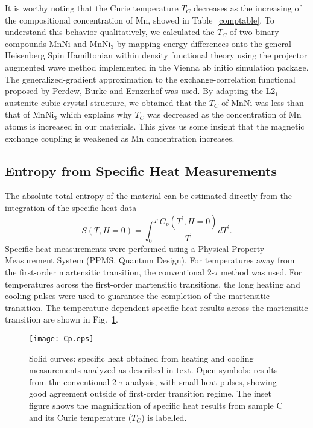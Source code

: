 \documentclass[sort&compress,twocolumn,3p]{elsarticle}
\begin{document}
It is worthy noting that the Curie temperature $T_C$ decreases as the increasing of the compositional concentration of Mn, showed in Table~\ref{comptable}.
To understand this behavior qualitatively, we calculated the $T_C$ of two binary compounds MnNi and MnNi$_3$ by mapping energy differences onto the general Heisenberg Spin Hamiltonian within density functional theory\cite{Hohenberg1964,Kohn1965} using the projector augmented wave method\cite{Kresse1999} implemented in the Vienna ab initio simulation package\cite{Kresse1993,Kresse1996}.
The generalized-gradient approximation to the exchange-correlation functional proposed by Perdew, Burke and Ernzerhof\cite{Perdew1996} was used.
By adapting the L2$_1$ austenite cubic crystal structure, we obtained that the $T_C$ of MnNi was less than that of MnNi$_3$ which explains why $T_C$ was decreased as the concentration of Mn atoms is increased in our materials.
This gives us some insight that the magnetic exchange coupling is weakened as Mn concentration increases.

\subsection{Entropy from Specific Heat Measurements}
The absolute total entropy of the material can be estimated directly from the integration of the specific heat data
\begin{equation}
S(T, H=0)=\int_0^T\frac{C_p(T^\prime,H=0)}{T^\prime}dT^\prime.
\label{S}
\end{equation}
Specific-heat measurements were performed using a Physical Property Measurement System (PPMS, Quantum Design).
For temperatures away from the first-order martensitic transition, the conventional 2-$\tau$ method\cite{:/content/aip/journal/rsi/68/1/10.1063/1.1147722} was used.
For temperatures across the first-order martensitic transitions, the long heating and cooling pulses were used to guarantee the completion of the martensitic transition\cite{:/content/aip/journal/jap/116/20/10.1063/1.4902527,Chen2016176}.
The temperature-dependent specific heat results across the martensitic transition are shown in Fig.~\ref{Cp}.

\begin{figure}
\texttt{[image: Cp.eps]}
\caption{Solid curves: specific heat obtained from heating and cooling measurements analyzed as described in text.
		Open symbols: results from the conventional 2-$\tau$ analysis, with small heat pulses, showing good agreement outside of first-order transition regime.
The inset figure shows the magnification of specific heat results from sample C and its Curie temperature ($T_C$) is labelled.
}
\label{Cp}
\end{figure}
\end{document}
